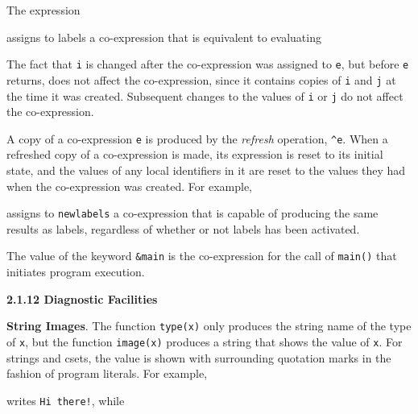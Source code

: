 The expression



\noindent assigns to labels a co-expression that is equivalent to evaluating



The fact that \texttt{i} is changed after the co-expression was
assigned to \texttt{e}, but before \texttt{e} returns, does not affect
the co-expression, since it contains copies of \texttt{i} and
\texttt{j} at the time it was created.  Subsequent changes to the
values of \texttt{i} or \texttt{j} do not affect the co-expression.

A copy of a co-expression \texttt{e} is produced by the
\textit{refresh }operation, \texttt{\^{}e}. When a refreshed copy of a
co-expression is made, its expression is reset to its initial state,
and the values of any local identifiers in it are reset to the values
they had when the co-expression was created. For example,



\noindent assigns to \texttt{newlabels} a co-expression that is
capable of producing the same results as labels, regardless of whether
or not labels has been activated.

The value of the keyword \texttt{\&main} is the co-expression for the
call of \texttt{main()} that initiates program execution.


{\sffamily\bfseries
2.1.12 Diagnostic Facilities}

\textbf{String Images}. The function \texttt{type(x)} only produces
the string name of the type of \texttt{x}, but the function
\texttt{image(x)} produces a string that shows the value of
\texttt{x}. For strings and csets, the value is shown with surrounding
quotation marks in the fashion of program literals. For example,



\noindent writes \texttt{{\textquotedbl}Hi there!{\textquotedbl}}, while

